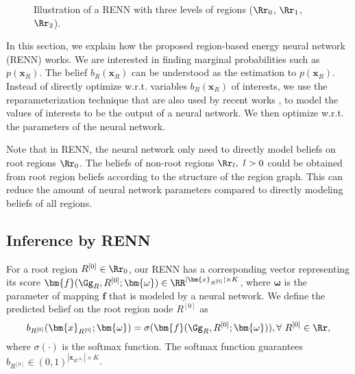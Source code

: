 \begin{figure}[!t]
  
  \caption{Illustration of a RENN with three levels of regions ($\Rr_0$, $\Rr_1$, $\Rr_2$).}
  \label{fig:renn-illustration}
  
\end{figure}


In this section, we explain how the proposed region-based energy neural network (RENN) works.
We are interested in finding marginal probabilities such as $p(\bm{x}_R)$. The belief $b_R(\bm{x}_R)$ can be understood as the estimation to $p(\bm{x}_R)$.
Instead of directly optimize w.r.t. variables ${b_R(\bm{x}_R)}$ of interests, we use the reparameterization technique that are also used by recent works \cite{DBLP:journals/corr/KingmaW13, srikumar-etal-2012-amortizing, NIPS2019_9687, akbayrak2019reparameterization}, to model the values of interests to be the output of a neural network. We then optimize w.r.t. the parameters of the neural network.

Note that in RENN, the neural network only need to directly model beliefs on root regions $\Rr_0$. The beliefs of non-root regions $\Rr_l,~l>0$ could be obtained from root region beliefs according to the structure of the region graph. This can reduce the amount of neural network parameters compared to directly modeling beliefs of all regions.

\subsection{Inference by RENN}
\label{sec:infer-renn}

For a root region $R^{[0]}\in \Rr_0$, our RENN has a corresponding vector representing its score $\bm{f}(\Gg_R, R^{[0]}; \bm{\omega}) \in \RR^{|{\bm{x}_{R^{[0]}}}| \times K}$, where $\bm{\omega}$ is the parameter of mapping $\bm{f}$ that is modeled by a neural network. We define the predicted belief on the root region node $R^{[0]}$ as
\begin{equation}
  b_{R^{[0]}}(\bm{x}_{R^{[0]}}; \bm{\omega}) = \sigma(\bm{f}(\Gg_R, R^{[0]}; \bm{\omega})), \forall~ {R^{[0]}} \in \Rr,
\end{equation}
where $\sigma(\cdot)$ is the softmax function. The softmax function guarantees $b_{R^{[0]}} \in (0,1)^{|{\bm{x}_{R^{[0]}}}| \times K}$.

